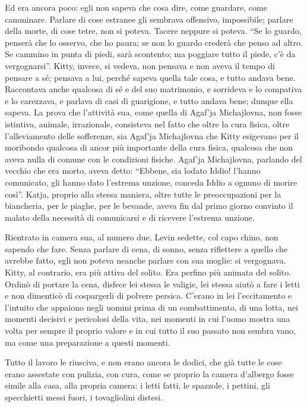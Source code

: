 Ed era ancora poco: egli non sapeva che cosa dire, come guardare, come camminare. Parlare di cose estranee gli sembrava offensivo, impossibile; parlare della morte, di cose tetre, non si poteva. Tacere neppure si poteva. ``Se lo guardo, penserà che lo osservo, che ho paura; se non lo guardo crederà che penso ad altro. Se cammino in punta di piedi, sarà scontento; ma poggiare tutto il piede, c'è da vergognarsi''. Kitty, invece, si vedeva, non pensava e non aveva il tempo di pensare a sé; pensava a lui, perché sapeva quella tale cosa, e tutto andava bene. Raccontava anche qualcosa di sé e del suo matrimonio, e sorrideva e lo compativa e lo carezzava, e parlava di casi di guarigione, e tutto andava bene; dunque ella sapeva. La prova che l'attività sua, come quella di Agaf'ja Michajlovna, non fosse istintiva, animale, irrazionale, consisteva nel fatto che oltre la cura fisica, oltre l'alleviamento delle sofferenze, sia Agaf'ja Michajlovna che Kitty esigevano per il moribondo qualcosa di ancor più importante della cura fisica, qualcosa che non aveva nulla di comune con le condizioni fisiche. Agaf'ja Michajlovna, parlando del vecchio che era morto, aveva detto: ``Ebbene, sia lodato Iddio! l'hanno comunicato, gli hanno dato l'estrema unzione, conceda Iddio a ognuno di morire così''. Katja, proprio alla stessa maniera, oltre tutte le preoccupazioni per la biancheria, per le piaghe, per le bevande, aveva fin dal primo giorno convinto il malato della necessità di comunicarsi e di ricevere l'estrema unzione. 

Rientrato in camera sua, al numero due, Levin sedette, col capo chino, non sapendo che fare. Senza parlare di cena, di sonno, senza riflettere a quello che avrebbe fatto, egli non poteva neanche parlare con sua moglie: si vergognava. Kitty, al contrario, era più attiva del solito. Era perfino più animata del solito. Ordinò di portare la cena, disfece lei stessa le valigie, lei stessa aiutò a fare i letti e non dimenticò di cospargerli di polvere persica. C'erano in lei l'eccitamento e l'intuito che appaiono negli uomini prima di un combattimento, di una lotta, nei momenti decisivi e pericolosi della vita, nei momenti in cui l'uomo mostra una volta per sempre il proprio valore e in cui tutto il suo passato non sembra vano, ma come una preparazione a questi momenti. 

Tutto il lavoro le riusciva, e non erano ancora le dodici, che già tutte le cose erano assestate con pulizia, con cura, come se proprio la camera d'albergo fosse simile alla casa, alla propria camera: i letti fatti, le spazzole, i pettini, gli specchietti messi fuori, i tovagliolini distesi. 

